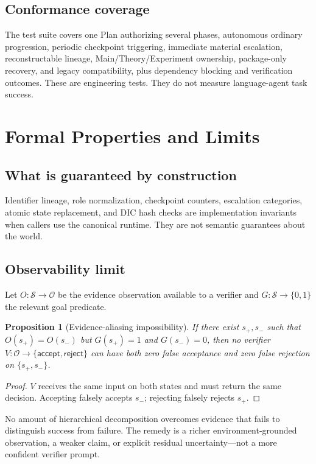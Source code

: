 \documentclass[11pt]{article}
\newtheorem{proposition}[definition]{Proposition}
\newcommand{\State}{\mathcal S}
\begin{document}
\subsection{Conformance coverage}
The test suite covers one Plan authorizing several phases, autonomous ordinary progression, periodic checkpoint triggering, immediate material escalation, reconstructable lineage, Main/Theory/Experiment ownership, package-only recovery, and legacy compatibility, plus dependency blocking and verification outcomes. These are engineering tests. They do not measure language-agent task success.

\section{Formal Properties and Limits}
\subsection{What is guaranteed by construction}
Identifier lineage, role normalization, checkpoint counters, escalation categories, atomic state replacement, and DIC hash checks are implementation invariants when callers use the canonical runtime. They are not semantic guarantees about the world.

\subsection{Observability limit}
Let $O:\State\to\mathcal O$ be the evidence observation available to a verifier and $G:\State\to\{0,1\}$ the relevant goal predicate.
\begin{proposition}[Evidence-aliasing impossibility]
\label{prop:observability}
If there exist $s_+,s_-$ such that $O(s_+)=O(s_-)$ but $G(s_+)=1$ and $G(s_-)=0$, then no verifier $V:\mathcal O\to\{\textsf{accept},\textsf{reject}\}$ can have both zero false acceptance and zero false rejection on $\{s_+,s_-\}$.
\end{proposition}
\begin{proof}
$V$ receives the same input on both states and must return the same decision. Accepting falsely accepts $s_-$; rejecting falsely rejects $s_+$.
\end{proof}
No amount of hierarchical decomposition overcomes evidence that fails to distinguish success from failure. The remedy is a richer environment-grounded observation, a weaker claim, or explicit residual uncertainty---not a more confident verifier prompt.
\end{document}
